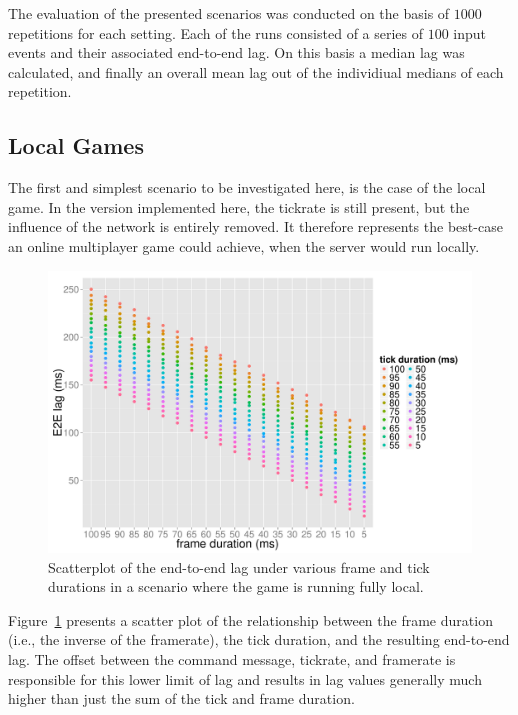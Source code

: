 The evaluation of the presented scenarios was conducted on the basis of $1000$ repetitions for each setting. Each of the runs consisted of a series of $100$ input events and their associated end-to-end lag. On this basis a median lag was calculated, and finally an overall mean lag out of the individiual medians of each repetition.


\subsection{Local Games}

The first and simplest scenario to be investigated here, is the case of the local game. In the version implemented here, the tickrate is still present, but the influence of the network is entirely removed. It therefore represents the best-case an online multiplayer game could achieve, when the server would run locally.

\begin{figure}[!t]
	\centering
	\includegraphics[width=1.0\columnwidth]{../simulation/visualization/nwless-onlinegame-1000rounds.pdf}
	\caption{Scatterplot of the end-to-end lag under various frame and tick durations in a scenario where the game is running fully local.}
\label{fig:nwless-scatter}
\end{figure}

Figure~\ref{fig:nwless-scatter} presents a scatter plot of the relationship between the frame duration (i.e., the inverse of the framerate), the tick duration, and the resulting end-to-end lag. The offset between the command message, tickrate, and framerate is responsible for this lower limit of lag and results in lag values generally much higher than just the sum of the tick and frame duration.

